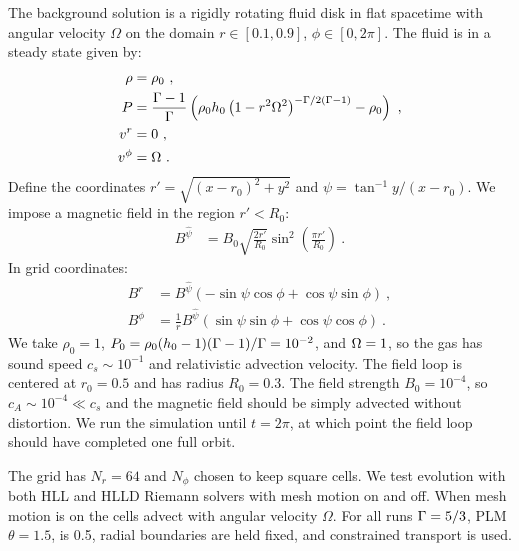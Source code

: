 The background solution is a rigidly rotating fluid disk in flat spacetime with angular velocity $\Omega$ on the domain $r\in[0.1,0.9]$, $\phi\in[0,2\pi]$.  The fluid is in a steady state given by:
\begin{align}
	\rho &= \rho_0 \ ,\\
	P &= \frac{\Gamma-1}{\Gamma}\left(\rho_0 h_0\left(1-r^2\Omega^2\right)^{-\Gamma / 2(\Gamma-1)} - \rho_0\right)\ ,\\
	v^r &= 0 \ ,\\
	v^\phi &= \Omega\ .
\end{align}
Define the coordinates $r' = \sqrt{(x-r_0)^2 + y^2}$ and $\psi = \tan^{-1} y/(x-r_0)$.  We impose a magnetic field in the region $r' < R_0$:
\begin{align}
	B^{\widehat{\psi}} &= B_0 \sqrt{\frac{2 r'}{R_0}} \sin^2\left(\frac{\pi r'}{R_0}\right)\ .
\end{align}
In grid coordinates:
\begin{align}
	B^r &= B^{\widehat{\psi}}\left( -\sin \psi \cos \phi + \cos \psi \sin \phi\right)\ , \\
	B^\phi &= \frac{1}{r} B^{\widehat{\psi}}\left( \sin \psi \sin \phi + \cos \psi \cos \phi\right) \ .
\end{align}
We take $\rho_0 = 1$, $P_0 = \rho_0 (h_0 - 1)(\Gamma-1)/\Gamma = 10^{-2}$, and $\Omega=1$, so the gas has sound speed $c_s \sim 10^{-1}$ and relativistic advection velocity.  The field loop is centered at $r_0 = 0.5$ and has radius $R_0 = 0.3$.  The field strength $B_0 = 10^{-4}$, so $c_A \sim 10^{-4} \ll c_s$ and the magnetic field should be simply advected without distortion.  We run the simulation until $t = 2\pi$, at which point the field loop should have completed one full orbit.

The grid has $N_r = 64$ and $N_\phi$ chosen to keep square cells. We test evolution with both HLL and HLLD Riemann solvers with mesh motion on and off.  When mesh motion is on the cells advect with angular velocity $\Omega$.  For all runs $\Gamma=5/3$, PLM $\theta =1.5$, \CFL is 0.5, radial boundaries are held fixed, and constrained transport is used.

